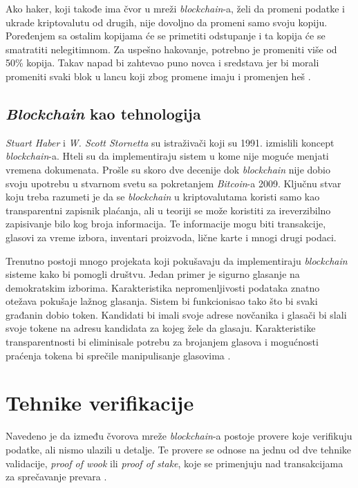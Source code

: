 \documentclass[a4paper]{article}
\begin{document}
{Ako haker, koji takođe ima čvor u mreži \emph{blockchain}-a, želi da promeni podatke i ukrade kriptovalutu od drugih, nije dovoljno da promeni samo svoju kopiju. Poređenjem sa ostalim kopijama će se primetiti odstupanje i ta kopija će se smatratiti nelegitimnom. Za uspešno hakovanje, potrebno je promeniti više od 50\% kopija. Takav napad bi zahtevao puno novca i sredstava jer bi morali promeniti svaki blok u lancu koji zbog promene imaju i promenjen heš \cite{blockchain}.


\subsection{\emph{Blockchain} kao tehnologija}
\label{subsec:tehnologija}
\emph{Stuart Haber} i \emph{W. Scott Stornetta} su istraživači koji su 1991. izmislili koncept \emph{blockchain}-a. Hteli su da implementiraju sistem u kome nije moguće menjati vremena dokumenata. Prošle su skoro dve decenije dok \emph{blockchain} nije dobio svoju upotrebu u stvarnom svetu sa pokretanjem \emph{Bitcoin}-a 2009. Ključnu stvar koju treba razumeti je da se  \emph{blockchain} u kriptovalutama koristi samo kao transparentni zapisnik plaćanja, ali u teoriji  se može koristiti za ireverzibilno zapisivanje bilo kog broja informacija. Te informacije mogu biti transakcije, glasovi za vreme izbora, inventari proizvoda, lične karte i mnogi drugi podaci.

Trenutno postoji mnogo projekata koji pokušavaju da implementiraju  \emph{blockchain} sisteme kako bi pomogli društvu. Jedan primer je sigurno glasanje na demokratskim izborima. Karakteristika nepromenljivosti podataka znatno otežava pokušaje lažnog glasanja. Sistem bi funkcionisao tako što bi svaki građanin dobio token. Kandidati bi imali svoje adrese novčanika i glasači bi slali svoje tokene na adresu kandidata za kojeg žele da glasaju. Karakteristike transparentnosti bi eliminisale potrebu za brojanjem glasova i mogućnosti praćenja tokena bi sprečile manipulisanje glasovima \cite{blockchain}.


\section{Tehnike verifikacije}
\label{sec:verifikacija}
Navedeno je da između čvorova mreže  \emph{blockchain}-a postoje provere koje verifikuju podatke, ali nismo ulazili u detalje. Te provere se odnose na jednu od dve tehnike validacije,  \emph{proof of wook} ili \emph{proof of stake}, koje se primenjuju nad transakcijama za sprečavanje prevara \cite{kriptovalute2}.

}
\end{document}
